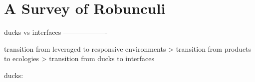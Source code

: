 \chapter{A Survey of Robunculi}
\label{ch:survey}
%
ducks vs interfaces
-------------------

transition from leveraged to responsive environments
> transition from products to ecologies
> transition from ducks to interfaces

ducks:



